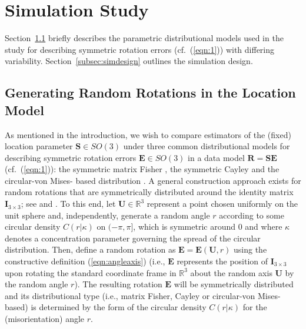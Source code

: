 
\section{Simulation Study}\label{ch:simulation}

Section~\ref{subsec:genRR} briefly describes the parametric distributional models used in the study for describing symmetric rotation errors (cf.~(\ref{eqn:1})) with differing variability. 
Section~\ref{subsec:simdesign} outlines the simulation design. %

\subsection{Generating Random Rotations in the Location Model}
\label{subsec:genRR}
As mentioned in the introduction, we wish to compare estimators of the (fixed) location parameter $\bm{S}\in SO(3)$
under three common distributional models for describing symmetric rotation errors $\bm{E}\in SO(3)$
 in a data model  $\bm{R}=\bm{S}\bm{E}$ (cf.~(\ref{eqn:1})):
the symmetric matrix Fisher \citep{langevin05, downs72, khatri77, jupp79}, the 
symmetric Cayley  \citep{Schaeben97, leon06} and the circular-von Mises-
based distribution \citep{bingham09}. A general 
construction approach exists for random rotations that are symmetrically distributed around the identity matrix $\bm{I}_{3 \times 3}$; see \cite{watson83, bingham09} and \cite{hielscher10}.
To this end, let $\bm{U}\in\mathbb{R}^3$ represent a point chosen
uniformly on the unit sphere and, independently, generate a random angle $r
$ according to some circular density $C(r|\kappa)$ on $(-\pi,\pi]$, which is 
symmetric around 0 and where $\kappa$ denotes a concentration 
parameter governing the spread of the circular distribution.  Then, define a random rotation as $\bm{E}=\bm{E}(\bm{U},r)$ using
the constructive definition (\ref{eqn:angleaxis}) (i.e., $\bm{E}$ represents the position of $\bm{I}_{3\times 3}$
upon rotating the standard coordinate frame in $\mathbb{R}^3$ about the random axis $\bm{U}$ by the random angle $r$).
The resulting rotation $\bm{E}$ will be symmetrically distributed and its distributional type (i.e., matrix Fisher, Cayley or circular-von Mises-based) is determined by the form of the circular density $C(r|\kappa)$
for the (misorientation) angle $r$.   

